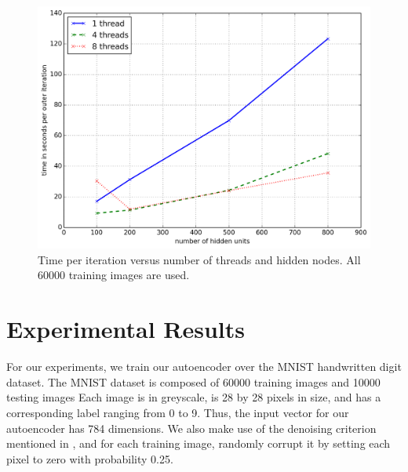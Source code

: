 \documentclass[conference]{IEEEtran}
\begin{document}
\begin{figure}[h]
\centering
\includegraphics[width=1.0\linewidth]{experiment2.png}
\caption{Time per iteration versus number of threads and hidden nodes. All 60000 training images are used.}
\label{fig:experiment2}
\end{figure}

\section{Experimental Results}
For our experiments, we train our autoencoder over the MNIST handwritten digit dataset. The MNIST dataset is composed of 60000 training images and 10000 testing images Each image is in greyscale, is 28 by 28 pixels in size, and has a corresponding label ranging from 0 to 9. Thus, the input vector for our autoencoder has 784 dimensions. We also make use of the denoising criterion mentioned in \cite{vincent2010stacked}, and for each training image, randomly corrupt it by setting each pixel to zero with probability 0.25. 
\end{document}
